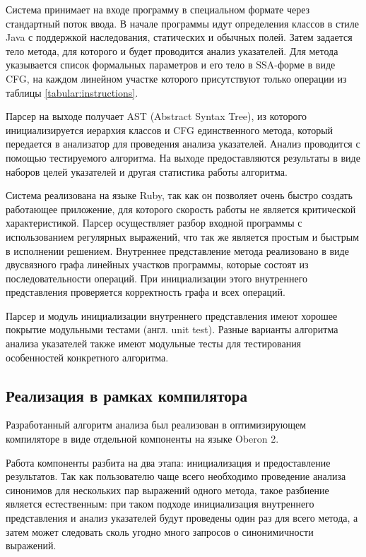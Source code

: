 \documentclass[14pt,titlepage]{extarticle}
\newcommand{\eng}[1]{{\English#1}}
\begin{document}
      Система принимает на входе программу в специальном формате через
      стандартный поток ввода. В начале программы идут определения классов в
      стиле Java с поддержкой наследования, статических и обычных полей. Затем
      задается тело метода, для которого и будет проводится анализ указателей.
      Для метода указывается список формальных параметров и его тело в
      SSA-форме в виде CFG, на каждом линейном участке которого присутствуют
      только операции из таблицы \ref{tabular:instructions}.

      Парсер на выходе получает AST (\eng{Abstract Syntax Tree}), из которого
      инициализируется иерархия классов и CFG единственного метода, который
      передается в анализатор для проведения анализа указателей. Анализ
      проводится с помощью тестируемого алгоритма. На выходе предоставляются
      результаты в виде наборов целей указателей и
      другая статистика работы алгоритма.

      Система реализована на языке Ruby, так как он позволяет очень быстро
      создать работающее приложение, для которого скорость работы не является
      критической характеристикой. Парсер осуществляет разбор входной
      программы с использованием регулярных выражений, что так же является
      простым и быстрым в исполнении решением. Внутреннее представление метода
      реализовано в виде двусвязного графа линейных участков программы,
      которые состоят из последовательности операций. При инициализации этого
      внутреннего представления проверяется корректность графа и всех операций.

      Парсер и модуль инициализации внутреннего представления имеют хорошее
      покрытие модульными тестами (англ. \eng{unit test}). Разные варианты
      алгоритма анализа указателей также имеют модульные тесты для тестирования
      особенностей конкретного алгоритма.

    \subsection{Реализация в рамках компилятора}

      Разработанный алгоритм анализа был реализован в оптимизирующем
      компиляторе в виде отдельной компоненты на языке \eng{Oberon} 2.

      Работа компоненты разбита на два этапа: инициализация и предоставление
      результатов. Так как пользователю чаще всего необходимо проведение
      анализа синонимов для нескольких пар выражений одного метода, такое
      разбиение является естественным: при таком подходе инициализация
      внутреннего представления и анализ указателей будут проведены один раз
      для всего метода, а затем может следовать сколь угодно много запросов о
      синонимичности выражений.
\end{document}
